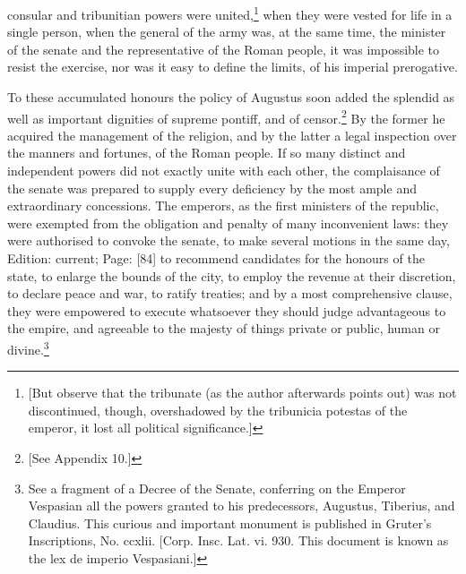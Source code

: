 consular and tribunitian powers were united,\footnote{[But observe that the tribunate (as the author afterwards points out) was not discontinued, though, overshadowed by the tribunicia potestas of the emperor, it lost all political significance.]} when they were vested for life in a single person, when the general of the army was, at the same time, the minister of the senate and the representative of the Roman people, it was impossible to resist the exercise, nor was it easy to define the limits, of his imperial prerogative.

To these accumulated honours the policy of Augustus soon added the splendid as well as important dignities of supreme pontiff, and of censor.\footnote{[See Appendix 10.]} By the former he acquired the management of the religion, and by the latter a legal inspection over the manners and fortunes, of the Roman people. If so many distinct and independent powers did not exactly unite with each other, the complaisance of the senate was prepared to supply every deficiency by the most ample and extraordinary concessions. The emperors, as the first ministers of the republic, were exempted from the obligation and penalty of many inconvenient laws: they were authorised to convoke the senate, to make several motions in the same day, Edition: current; Page: [84] to recommend candidates for the honours of the state, to enlarge the bounds of the city, to employ the revenue at their discretion, to declare peace and war, to ratify treaties; and by a most comprehensive clause, they were empowered to execute whatsoever they should judge advantageous to the empire, and agreeable to the majesty of things private or public, human or divine.\footnote{See a fragment of a Decree of the Senate, conferring on the Emperor Vespasian all the powers granted to his predecessors, Augustus, Tiberius, and Claudius. This curious and important monument is published in Gruter\texthebrew{}’s Inscriptions, No. ccxlii. [Corp. Insc. Lat. vi. 930. This document is known as the lex de imperio Vespasiani.]}


